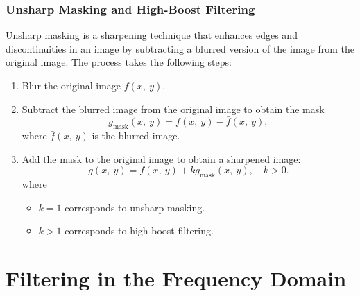 \documentclass{article}
\begin{document}
\subsubsection{Unsharp Masking and High-Boost Filtering}
Unsharp masking is a sharpening technique that enhances edges and
discontinuities in an image by subtracting a blurred version of the
image from the original image. The process takes the following steps:
\begin{enumerate}
    \item Blur the original image \(f\left( x,\: y \right)\).
    \item Subtract the blurred image from the original image to obtain the mask
    \begin{equation*}
        g_{\text{mask}}\left( x,\: y \right) = f\left( x,\: y \right) - \bar{f}\left( x,\: y \right),
    \end{equation*}
    where \(\bar{f}\left( x,\: y \right)\) is the blurred image.
    \item Add the mask to the original image to obtain a sharpened image:
    \begin{equation*}
        g\left( x,\: y \right) = f\left( x,\: y \right) + k g_{\text{mask}}\left( x,\: y \right), \quad k > 0.
    \end{equation*}
    where
    \begin{itemize}
        \item \(k = 1\) corresponds to unsharp masking.
        \item \(k > 1\) corresponds to high-boost filtering.
    \end{itemize}
\end{enumerate}
\section{Filtering in the Frequency Domain}
\end{document}
